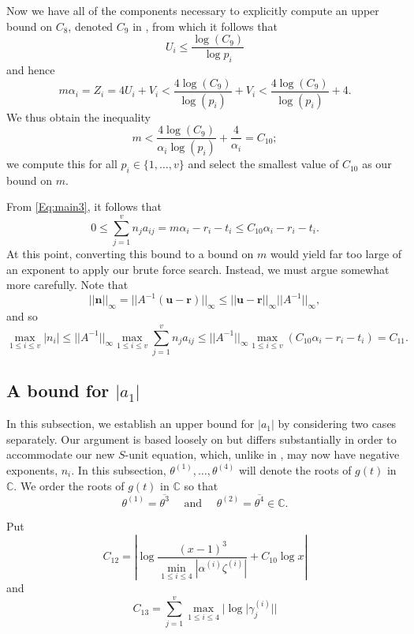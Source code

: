 Now we have all of the components necessary to explicitly compute an upper bound on $C_8$, denoted $C_9$ in \cite{BugeaudGyory}, from which it follows that
\[U_i \leq \frac{\log(C_9)}{\log{p_i}}\]
and hence
\[m\alpha_i = Z_i = 4U_i + V_i < \frac{4\log(C_9)}{\log(p_i)} + V_i < \frac{4\log(C_9)}{\log(p_i)} + 4.\] 
We thus obtain the inequality  
\[m < \frac{4\log(C_9)}{\alpha_i\log(p_i)} + \frac{4}{\alpha_i} = C_{10};\]
we compute this for all $p_i \in \{1, \dots, v\}$ and select the smallest value of $C_{10}$ as our bound on $m$. 
 
From \eqref{Eq:main3}, it follows that
\[0 \leq \sum_{j=1}^v n_ja_{ij} = m\alpha_i - r_i - t_i \leq C_{10}\alpha_i - r_i - t_i.\]
At this point, converting this bound to a bound on $m$ would yield far too large of an exponent to apply our brute force search. Instead, we must argue somewhat more carefully. 
Note that 
\[||\mathbf{n}||_{\infty} = ||A^{-1}(\mathbf{u} - \mathbf{r})||_{\infty} \leq ||\mathbf{u} - \mathbf{r}||_{\infty}||A^{-1}||_{\infty},\]
and so
\[\max_{1 \leq i \leq v}|n_i| \leq ||A^{-1}||_{\infty}\max_{1 \leq i\leq v}\sum_{j = 1}^v n_j a_{ij}
\leq ||A^{-1}||_{\infty} \max_{1 \leq i\leq v}(C_{10}\alpha_i - r_i - t_i) = C_{11}.\]


\subsection{A bound for $|a_1|$}

In this subsection, we establish an upper bound for $|a_1|$ by considering two cases separately. Our argument is based loosely on \cite{TW3} but differs substantially in order to accommodate our new $S$-unit equation, which, unlike in \cite{TW3}, may now have negative exponents, $n_i$. In this subsection, $\theta^{(1)}, \dots, \theta^{(4)}$ will denote the roots of $g(t)$ in $\mathbb{C}$. We order the roots of $g(t)$ in $\mathbb{C}$ so that
\[\theta^{(1)} = \overline{\theta^{3}} \quad \text{ and } \quad \theta^{(2)} = \overline{\theta^{4}} \in \mathbb{C}.\]



Put
\[C_{12} = \left|\log \frac{(x-1)^3}{\displaystyle \min_{1\leq i \leq 4} |\alpha^{(i)}\zeta^{(i)}|} + C_{10} \log{x}\right|\]
and 
\[C_{13} = \sum_{j = 1}^v \max_{1\leq i \leq 4} |\log|\gamma_j^{(i)}||\]


